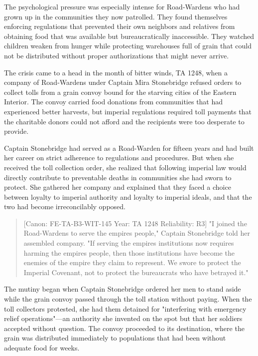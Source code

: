 The psychological pressure was especially intense for Road-Wardens who
had grown up in the communities they now patrolled. They found
themselves enforcing regulations that prevented their own neighbors and
relatives from obtaining food that was available but bureaucratically
inaccessible. They watched children weaken from hunger while protecting
warehouses full of grain that could not be distributed without proper
authorizations that might never arrive.

The crisis came to a head in the month of bitter winds, TA 1248, when a
company of Road-Wardens under Captain Mira Stonebridge refused orders to
collect tolls from a grain convoy bound for the starving cities of the
Eastern Interior. The convoy carried food donations from communities
that had experienced better harvests, but imperial regulations required
toll payments that the charitable donors could not afford and the
recipients were too desperate to provide.

Captain Stonebridge had served as a Road-Warden for fifteen years and
had built her career on strict adherence to regulations and procedures.
But when she received the toll collection order, she realized that
following imperial law would directly contribute to preventable deaths
in communities she had sworn to protect. She gathered her company and
explained that they faced a choice between loyalty to imperial authority
and loyalty to imperial ideals, and that the two had become
irreconcilably opposed.

\begin{quote}
{[}Canon: FE-TA-B3-WIT-145 \textbar{} Year: TA 1248 \textbar{}
Reliability: R3{]} "I joined the Road-Wardens to serve the
empire\textquotesingle s people," Captain Stonebridge told her assembled
company. "If serving the empire\textquotesingle s institutions now
requires harming the empire\textquotesingle s people, then those
institutions have become the enemies of the empire they claim to
represent. We swore to protect the Imperial Covenant, not to protect the
bureaucrats who have betrayed it."
\end{quote}

The mutiny began when Captain Stonebridge ordered her men to stand aside
while the grain convoy passed through the toll station without paying.
When the toll collectors protested, she had them detained for
"interfering with emergency relief operations"---an authority she
invented on the spot but that her soldiers accepted without question.
The convoy proceeded to its destination, where the grain was distributed
immediately to populations that had been without adequate food for
weeks.

